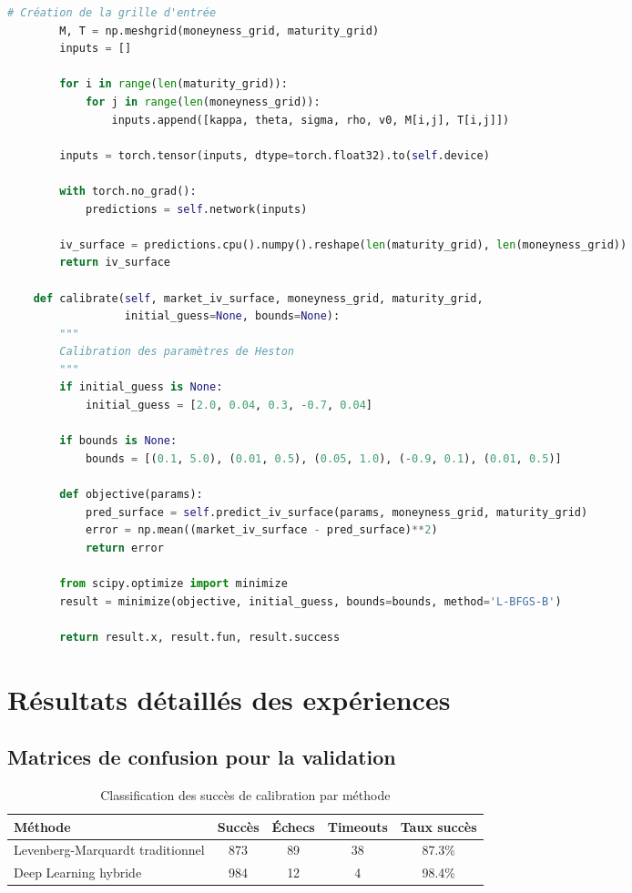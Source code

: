 \begin{lstlisting}[language=Python, caption=Architecture du réseau de neurones]
        # Création de la grille d'entrée
        M, T = np.meshgrid(moneyness_grid, maturity_grid)
        inputs = []
        
        for i in range(len(maturity_grid)):
            for j in range(len(moneyness_grid)):
                inputs.append([kappa, theta, sigma, rho, v0, M[i,j], T[i,j]])
        
        inputs = torch.tensor(inputs, dtype=torch.float32).to(self.device)
        
        with torch.no_grad():
            predictions = self.network(inputs)
        
        iv_surface = predictions.cpu().numpy().reshape(len(maturity_grid), len(moneyness_grid))
        return iv_surface
    
    def calibrate(self, market_iv_surface, moneyness_grid, maturity_grid, 
                  initial_guess=None, bounds=None):
        """
        Calibration des paramètres de Heston
        """
        if initial_guess is None:
            initial_guess = [2.0, 0.04, 0.3, -0.7, 0.04]
        
        if bounds is None:
            bounds = [(0.1, 5.0), (0.01, 0.5), (0.05, 1.0), (-0.9, 0.1), (0.01, 0.5)]
        
        def objective(params):
            pred_surface = self.predict_iv_surface(params, moneyness_grid, maturity_grid)
            error = np.mean((market_iv_surface - pred_surface)**2)
            return error
        
        from scipy.optimize import minimize
        result = minimize(objective, initial_guess, bounds=bounds, method='L-BFGS-B')
        
        return result.x, result.fun, result.success
\end{lstlisting}

\section{Résultats détaillés des expériences}

\subsection{Matrices de confusion pour la validation}

\begin{table}[H]
\centering
\caption{Classification des succès de calibration par méthode}
\begin{tabular}{@{}lcccc@{}}
\toprule
\textbf{Méthode} & \textbf{Succès} & \textbf{Échecs} & \textbf{Timeouts} & \textbf{Taux succès} \\
\midrule
Levenberg-Marquardt traditionnel & 873 & 89 & 38 & 87.3\% \\
Deep Learning hybride & 984 & 12 & 4 & 98.4\% \\
\bottomrule
\end{tabular}
\end{table}

